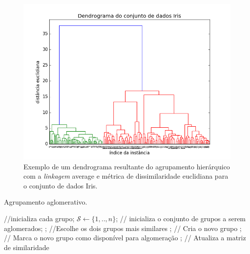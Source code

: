 \begin{figure}[h!]
	\includegraphics[width=\linewidth]{figuras/dendrograma_exemplo.png}
	\caption{Exemplo de um dendrograma resultante do agrupamento hierárquico com a \emph{linkagem} average e métrica de dissimilaridade euclidiana para o conjunto de dados Iris.}
	\label{fig:dendrograma_exemplo}
\end{figure}

\begin{algorithm}
	\caption{Agrupamento aglomerativo.}
	\label{alg:aglomerative_clustering}
	\begin{algorithmic}[1]
		
			 //inicializa cada grupo;
		\ENDFOR
		\STATE $\mathcal{S} \leftarrow \{1,..,n\}$; // inicializa o conjunto de grupos a serem aglomerados;
			; //Escolhe os dois grupos mais similares
			; // Cria o novo grupo
				; // Marca o novo grupo como disponível para algomeração
			\ENDIF
			\renewcommand{\algorithmicforall}{\textbf{foreach}}
				 ; // Atualiza a matriz de similaridade
			\ENDFOR			
		\ENDWHILE
		
	\end{algorithmic}
\end{algorithm}


